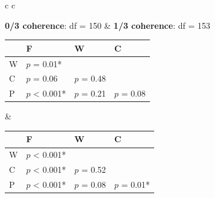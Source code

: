 \documentclass[man,floatsintext]{apa6}
\begin{document}
\begin{figure}[h]
  \begin{center}
    \begin{tabular}{ c c}

      \textbf{0/3 coherence}: df = 150 & \textbf{1/3 coherence}: df = 153\\
      
      {




        \small

        \begin{tabular}{| l | l |  l | l |}
          \hline
          & F              & W           & C \\ 
          \hline
          W & $p$ = 0.01*  &             &\\
          \hline
          C & $p$ = 0.06 &  $p$ = 0.48 & \\
          \hline
          P & $p$ < 0.001* &  $p$ = 0.21 &  $p$ = 0.08 \\
          \hline
        \end{tabular}
      } & 

      {




        \small
        \begin{tabular}{| l | l |  l | l |}
          \hline
          & F               & W           & C \\ 
          \hline
          W &  $p$ < 0.001* &             &\\
          \hline
          C &  $p$ < 0.001* &  $p$ = 0.52 &\\
          \hline
          P &  $p$ < 0.001* &  $p$ = 0.08 &  $p$ = 0.01*\\
          \hline
        \end{tabular}
      }\\


\end{tabular}
\end{center}
\end{figure}
\end{document}
